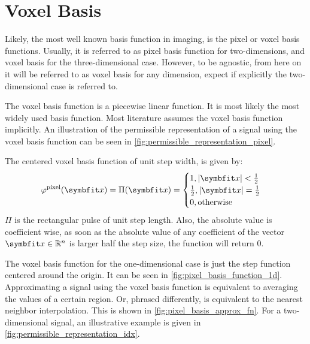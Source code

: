 \section{Voxel Basis}\label{sec:voxel_basis}

Likely, the most well known basis function in imaging, is the pixel or voxel basis functions.
Usually, it is referred to as pixel basis function for two-dimensions, and voxel basis for the
three-dimensional case. However, to be agnostic, from here on it will be referred to as voxel basis
for any dimension, expect if explicitly the two-dimensional case is referred to.

The voxel basis function is a piecewise linear function. It is most likely the most widely used
basis function. Most literature assumes the voxel basis function implicitly. An illustration of the
permissible representation of a signal using the voxel basis function can be seen in
\autoref{fig:permissible_representation_pixel}.

The centered voxel basis function of unit step width, is given by:
\begin{equation}\label{eq:voxel_basis_fn}
	\varphi^{\text{pixel}}(\mvec{x}) = \Pi(\mvec{x}) =
	\begin{cases}
		1, \abs{\mvec{x}} < \frac{1}{2}           \\
		\frac{1}{2}, \abs{\mvec{x}} = \frac{1}{2} \\
		0, \text{otherwise}
	\end{cases}
\end{equation}
\(\Pi\) is the rectangular pulse of unit step length. Also, the absolute value is coefficient wise,
as soon as the absolute value of any coefficient of the vector \(\mvec{x} \in \mathbb{R}^n\) is
larger half the step size, the function will return \(0\).

The voxel basis function for the one-dimensional case is just the step function centered around the
origin. It can be seen in \autoref{fig:pixel_basis_function_1d}. Approximating a signal using the
voxel basis function is equivalent to averaging the values of a certain region. Or, phrased
differently, is equivalent to the nearest neighbor interpolation. This is shown in
\autoref{fig:pixel_basis_approx_fn}. For a two-dimensional signal, an illustrative example is given
in \autoref{fig:permissible_representation_idx}.

